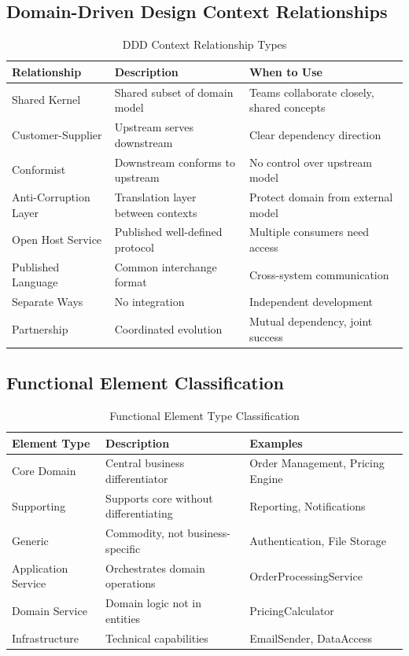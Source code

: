 \documentclass[11pt,letterpaper]{article}
\begin{document}
\subsection{Domain-Driven Design Context Relationships}

\begin{table}[H]
\centering
\caption{DDD Context Relationship Types}
\small
\begin{tabular}{@{}L{2.8cm}L{4.5cm}L{5.5cm}@{}}
\toprule
\textbf{Relationship} & \textbf{Description} & \textbf{When to Use} \\
\midrule
Shared Kernel & Shared subset of domain model & Teams collaborate closely, shared concepts \\
\addlinespace
Customer-Supplier & Upstream serves downstream & Clear dependency direction \\
\addlinespace
Conformist & Downstream conforms to upstream & No control over upstream model \\
\addlinespace
Anti-Corruption Layer & Translation layer between contexts & Protect domain from external model \\
\addlinespace
Open Host Service & Published well-defined protocol & Multiple consumers need access \\
\addlinespace
Published Language & Common interchange format & Cross-system communication \\
\addlinespace
Separate Ways & No integration & Independent development \\
\addlinespace
Partnership & Coordinated evolution & Mutual dependency, joint success \\
\bottomrule
\end{tabular}
\end{table}

\subsection{Functional Element Classification}

\begin{table}[H]
\centering
\caption{Functional Element Type Classification}
\small
\begin{tabular}{@{}L{2.5cm}L{4cm}L{6.5cm}@{}}
\toprule
\textbf{Element Type} & \textbf{Description} & \textbf{Examples} \\
\midrule
Core Domain & Central business differentiator & Order Management, Pricing Engine \\
\addlinespace
Supporting & Supports core without differentiating & Reporting, Notifications \\
\addlinespace
Generic & Commodity, not business-specific & Authentication, File Storage \\
\addlinespace
Application Service & Orchestrates domain operations & OrderProcessingService \\
\addlinespace
Domain Service & Domain logic not in entities & PricingCalculator \\
\addlinespace
Infrastructure & Technical capabilities & EmailSender, DataAccess \\
\bottomrule
\end{tabular}
\end{table}
\end{document}

